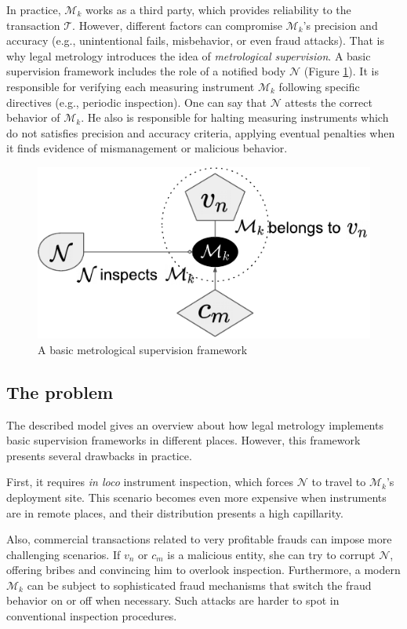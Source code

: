 \documentclass[sigplan]{acmart}
\begin{document}
In practice, $\mathcal{M}_k$ works as a third party, which provides reliability to the transaction $\mathcal{T}$. 
However, different factors can compromise $\mathcal{M}_k$'s precision and accuracy (e.g., unintentional fails, misbehavior, or even fraud attacks).
That is why legal metrology introduces the idea of \emph{metrological supervision}.
A basic supervision framework includes the role of a notified body $\mathcal{N}$ (Figure \ref{f:basicframe1}).
It is responsible for verifying each measuring instrument $\mathcal{M}_k$ following specific directives (e.g., periodic inspection).
One can say that $\mathcal{N}$ attests the correct behavior of $\mathcal{M}_k$.
He also is responsible for halting measuring instruments which do not satisfies precision and accuracy criteria, applying eventual penalties when it finds evidence of mismanagement or malicious behavior.

\begin{figure}[!t]
\centering
\includegraphics[width=.4\textwidth]{basicframe1}
\caption{A basic metrological supervision framework}
\label{f:basicframe1}
\end{figure}

\subsection{The problem}
The described model gives an overview about how legal metrology implements basic supervision frameworks in different places.
However, this framework presents several drawbacks in practice.

First, it requires \textit{in loco} instrument inspection, which forces $\mathcal{N}$ to travel to $\mathcal{M}_k$'s deployment site.
This scenario becomes even more expensive when instruments are in remote places, and their distribution presents a high capillarity.

Also, commercial transactions related to very profitable frauds can impose more challenging scenarios.
If $v_n$ or $c_m$ is a malicious entity, she can try to corrupt $\mathcal{N}$, offering bribes and convincing him to overlook inspection.
Furthermore, a modern $\mathcal{M}_k$ can be subject to sophisticated fraud mechanisms that switch the fraud behavior on or off when necessary.
Such attacks are harder to spot in conventional inspection procedures.
\end{document}
